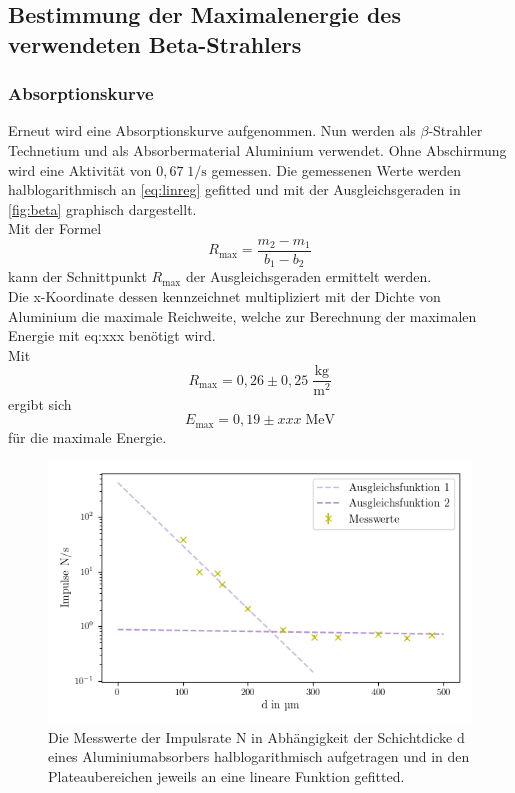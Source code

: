 \subsection{Bestimmung der Maximalenergie des verwendeten Beta-Strahlers}
\subsubsection*{Absorptionskurve}
Erneut wird eine Absorptionskurve aufgenommen. Nun werden als $\beta$-Strahler Technetium
und als Absorbermaterial Aluminium verwendet. 
Ohne Abschirmung wird eine Aktivität von $0,67 \; \mathrm{1/s}$ gemessen.
Die gemessenen Werte werden halblogarithmisch an \autoref{eq:linreg} gefitted und mit der Ausgleichsgeraden
in \autoref{fig:beta} graphisch dargestellt.\\
Mit der Formel
\begin{equation*}
  R_{\max} = \frac{m_2 - m_1}{b_1 - b_2}
\end{equation*}
kann der Schnittpunkt $R_{\max}$ der Ausgleichsgeraden ermittelt werden.\\
Die x-Koordinate dessen kennzeichnet multipliziert mit der Dichte von Aluminium \cite{aludichte} die maximale Reichweite, welche 
zur Berechnung der maximalen Energie mit eq:xxx benötigt wird. \\
Mit 
\begin{equation*}
  R_{\max} = 0,26 \pm 0,25 \; \mathrm{\frac{kg}{m^2}}   %
\end{equation*}
ergibt sich 
\begin{equation*}
  E_{\max} = 0,19 \pm xxx \; \mathrm{MeV}    %
\end{equation*}
für die maximale Energie.

\begin{figure}[H]
  \centering
  \includegraphics{content/zeitdruck.png}
  \caption{Die Messwerte der Impulsrate N in Abhängigkeit der 
  Schichtdicke d eines Aluminiumabsorbers halblogarithmisch aufgetragen und in den Plateaubereichen jeweils an eine lineare Funktion gefitted.}
  \label{fig:beta}
\end{figure}
